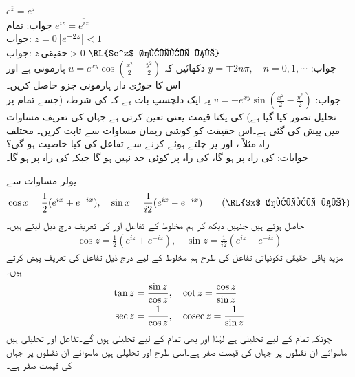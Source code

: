 \quad
$e^{\bar{z}}=\overline{e^z}$\\
جواب:\quad
تمام 
\quad
$e^{i\bar{z}}=\overline{e^{iz}}$\\
جواب:\quad
$z=0$
\quad
$\abs{e^{-2z}}<1$\\
جواب:\quad
$z\,\text{حقیقی}>0$
\quad
$\text{\RL{$e^z$ حقیقی ہے}}$\\
جواب:\quad
$y=\mp 2n\pi,\quad n=0,1,\cdots$
\quad
دکھائیں کہ 
$u=e^{xy}\cos(\tfrac{x^2}{2}-\tfrac{y^2}{2})$
ہارمونی ہے اور اس کا جوڑی دار  ہارمونی جزو حاصل کریں۔\\
جواب:\quad
$v=-e^{xy}\sin(\tfrac{x^2}{2}-\tfrac{y^2}{2})$
\quad
یہ ایک دلچسپ بات ہے کہ  کی شرط،  (جسے تمام  پر تحلیل تصور کیا گیا ہے) کی یکتا قیمت یعنی  تعین کرتی ہے جہاں  کی تعریف مساوات  میں پیش کی گئی ہے۔اس حقیقت کو کوشی ریمان مساوات سے ثابت کریں۔
\quad
مختلف راہ مثلاً ،  اور  پر چلتے ہوئے    کرنے سے  تفاعل  کی کیا خاصیت ہو گی؟ \\
جوابات:\quad {} کی راہ  پر  ہو گا،  کی راہ  پر کوئی حد نہیں ہو گا جبکہ  کی راہ  پر  ہو گا۔

یولر مساوات  سے
\begin{align*}
\cos x=\frac{1}{2}(e^{ix}+e^{-ix}),\quad \sin x=\frac{1}{i2}(e^{ix}-e^{-ix})\quad \quad (\text{\RL{$x$ حقیقی ہے}})
\end{align*}
حاصل ہوتے ہیں جنہیں دیکھ کر ہم مخلوط  کے تفاعل  اور  کی تعریف درج ذیل لیتے ہیں۔
\begin{align}\label{مساوات_مخلوط_ہذلولی_تعریف_الف}
\cos z=\frac{1}{2}(e^{iz}+e^{-iz}),\quad \sin z=\frac{1}{i2}(e^{iz}-e^{-iz})
\end{align}
مزید باقی حقیقی تکونیاتی تفاعل کی طرح ہم مخلوط  کے لیے درج ذیل  تفاعل کی تعریف پیش کرتے ہیں۔ 
\begin{align}
\tan z&=\frac{\sin z}{\cos z},\quad \cot z=\frac{\cos z}{\sin z}\label{مساوات_مخلوط_ہذلولی_تعریف_ب}\\
\sec z&=\frac{1}{\cos z},\quad \operatorname{cosec} z=\frac{1}{\sin z}\label{مساوات_مخلوط_ہذلولی_تعریف_پ}
\end{align}
چونکہ  تمام  کے لیے تحلیلی ہے لہٰذا  اور  بھی تمام  کے لیے تحلیلی ہوں گے۔تفاعل  اور  تحلیلی ہیں ماسوائے ان نقطوں پر جہاں  کی قیمت صفر ہے۔اسی طرح   اور  تحلیلی ہیں ماسوائے ان نقطوں پر جہاں  کی قیمت صفر ہے۔

